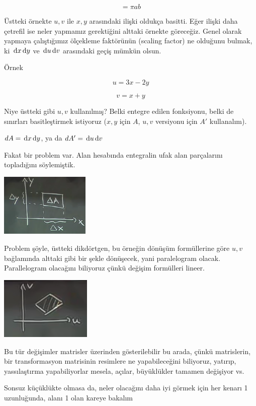 \documentclass[12pt,fleqn]{article}\usepackage{../../common}
\begin{document}
$$ = \pi ab $$

Üstteki örnekte $u,v$ ile $x,y$ arasındaki ilişki oldukça basitti. Eğer ilişki
daha çetrefil ise neler yapmamız gerektiğini alttaki örnekte göreceğiz. Genel
olarak yapmaya çalıştığımız ölçekleme faktörünün (scaling factor) ne olduğunu
bulmak, ki $\,\mathrm{d} x \,\mathrm{d} y$ ve $\,\mathrm{d} u \,\mathrm{d} v$ arasındaki geçiş mümkün olsun.

Örnek 

$$ u = 3x - 2y $$

$$ v = x + y $$

Niye üstteki gibi $u,v$ kullanılmış? Belki entegre edilen fonksiyonu, belki
de sınırları basitleştirmek istiyoruz ($x,y$ için $A$, $u,v$ versiyonu için
$A'$ kullanalım). 

$dA = \,\mathrm{d} x \,\mathrm{d} y$, ya da $dA' = \,\mathrm{d} u \,\mathrm{d} v$ 

Fakat bir problem var. Alan hesabında entegralin ufak alan parçalarını
topladığını söylemiştik. 

\begin{center}
\includegraphics[height=3cm]{18_2.png}
\end{center}

Problem şöyle, üstteki dikdörtgen, bu örneğin dönüşüm formüllerine göre $u,v$
bağlamında alttaki gibi bir şekle dönüşecek, yani paralelogram
olacak. Parallelogram olacağını biliyoruz çünkü değişim formülleri lineer.

\begin{center}
\includegraphics[height=3cm]{18_3.png}
\end{center}

Bu tür değişimler matrisler üzerinden gösterilebilir bu arada, çünkü
matrislerin, bir transformasyon matrisinin resimlere ne yapabileceğini
biliyoruz, yatırıp, yassılaştırma yapabiliyorlar mesela, açılar,
büyüklükler tamamen değişiyor vs. 

Sonsuz küçüklükte olmasa da, neler olacağını daha iyi görmek için her
kenarı 1 uzunluğunda, alanı 1 olan kareye bakalım
\end{document}
